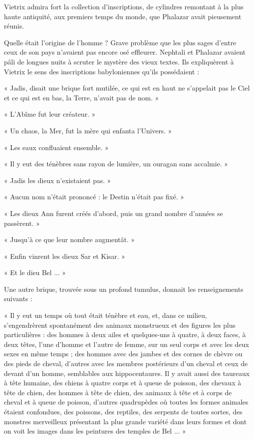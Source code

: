 \documentclass[a4paper, 11pt, oneside, polutonikogreek, french]{article}
\begin{document}
Vietrix admira fort la collection d'inscriptions, de cylindres remontant à la plus haute antiquité, aux premiers temps du monde, que Phalazar avait pieusement réunis.

Quelle était l'origine de l'homme ? Grave problème que les plus sages d'entre ceux de son pays n'avaient pas encore osé effleurer. Nephtali et Phalazar avaient pâli de longues nuits à scruter le mystère des vieux textes. Ils expliquèrent à Vietrix le sens des inscriptions babyloniennes qu'ils possédaient :

« Jadis, disait une brique fort mutilée, ce qui est en haut ne s'appelait pas le Ciel et ce qui est en bas, la Terre, n'avait pas de nom. »

« L'Abîme fut leur créateur. »

« Un chaos, la Mer, fut la mère qui enfanta l'Univers. »

« Les eaux confluaient ensemble. »

« Il y eut des ténèbres sans rayon de lumière, un ouragan sans accalmie. »

« Jadis les dieux n'existaient pas. »

« Aucun nom n'était prononcé : le Destin n'était pas fixé. »

« Les dieux Ann furent créés d'abord, puis un grand nombre d'années se passèrent. »

« Jusqu'à ce que leur nombre augmentât. »

« Enfin vinrent les dieux Sar et Kisar. »

« Et le dieu Bel ... »

Une autre brique, trouvée sous un profond tumulus, donnait les renseignements suivants :

« Il y eut un temps où tout était ténèbre et eau, et, dans ce milieu, s'engendrèrent spontanément des animaux monstrueux et des figures les plus particulières : des hommes à deux ailes et quelques-uns à quatre, à deux faces, à deux têtes, l'une d'homme et l'autre de femme, sur un seul corps et avec les deux sexes en même temps ; des hommes avec des jambes et des cornes de chèvre ou des pieds de cheval, d'autres avec les membres postérieurs d'un cheval et ceux de devant d'un homme, semblables aux hippocentaures. Il y avait aussi des taureaux à tête humaine, des chiens à quatre corps et à queue de poisson, des chevaux à tête de chien, des hommes à tête de chien, des animaux à tête et à corps de cheval et à queue de poisson, d'autres quadrupèdes où toutes les formes animales étaient confondues, des poissons, des reptiles, des serpents de toutes sortes, des monstres merveilleux présentant la plus grande variété dans leurs formes et dont on voit les images dans les peintures des temples de Bel ... »
\end{document}
